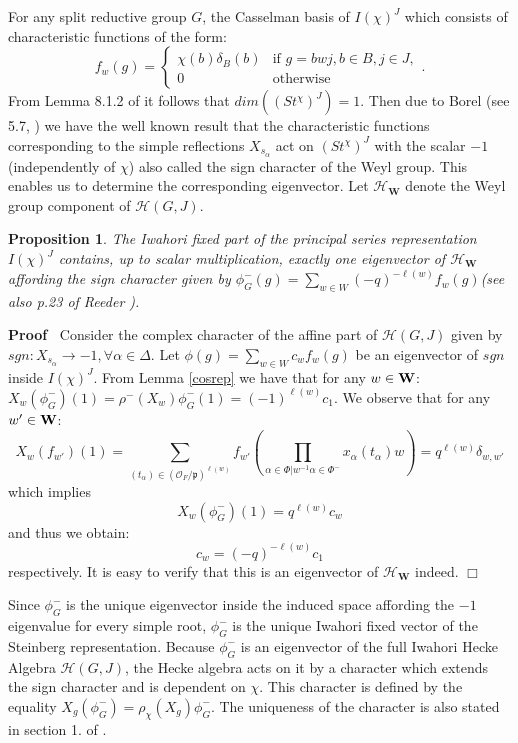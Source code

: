 \documentclass{article}
\newenvironment{proof}{\noindent\textbf{Proof\ }}{\hspace*{\fill}$\Box$\medskip}
\newtheorem{proposition}{Proposition}
\begin{document}
For any split reductive group $G$, the Casselman basis of $I(\chi)^J$ which consists of characteristic functions of the form:
$$f_w(g)=\begin{cases}
        \chi(b)\delta_B(b) & \text{if } g=bwj, b\in B,j\in J,   \\
        0 & \text{otherwise} 
    \end{cases}.
$$
 From Lemma 8.1.2 of \cite{cassnotes} it follows that $dim((St^{\chi})^J)=1$. Then due to Borel (see 5.7, \cite{bor}) we have the well known result that the characteristic functions corresponding to the simple reflections $X_{s_{\alpha}}$ act on $(St^{\chi})^J$ with the scalar $-1$ (independently of $\chi$) also called the sign character of the Weyl group. This enables us to determine the corresponding eigenvector. Let $\mathcal{H}_{\mathbf{W}}$ denote the Weyl group component of $\mathcal{H}(G,J)$.
\begin{proposition} \label{fixvec}
    The Iwahori fixed part of the principal series representation $I(\chi)^J$ contains, up to scalar multiplication, exactly one eigenvector of $\mathcal{H}_{\mathbf{W}}$ affording the sign character given by $\phi_G^-(g)=\sum\limits_{w\in W}(-q)^{-\ell(w)}f_w(g)$(see also p.23 of Reeder \cite{reeder}).
\end{proposition}
\begin{proof}
    Consider the complex character of the affine part of $\mathcal{H}(G,J)$ given by $sgn:X_{s_{\alpha}}\to -1, \forall\alpha\in\Delta$. Let $\phi(g)=\sum\limits_{w\in W}c_wf_w(g)$ be an eigenvector of $sgn$ inside $I(\chi)^J$. From Lemma \ref{cosrep} we have that for any $w\in\bf{W}$: $X_w(\phi_G^-)(1)=\rho^-(X_w)\phi_G^-(1)=(-1)^{\ell(w)}c_1$. We observe that for any $w'\in \bf{W}$: $$X_w(f_{w'})(1)=\sum\limits_{(t_{\alpha})\in(\mathcal{O}_F/\mathfrak{p})^{\ell(w)}}f_{w'}(\prod\limits_{\alpha\in\Phi|w^{-1}\alpha\in\Phi^-}x_{\alpha}(t_{\alpha})w)=q^{\ell(w)}\delta_{w,w'}$$ which implies $$X_w(\phi_G^-)(1)=q^{\ell(w)}c_w$$ and thus we obtain: $$c_w=(-q)^{-\ell(w)}c_1$$ respectively.
    It is easy to verify that this is an eigenvector of $\mathcal{H}_{\mathbf{W}}$ indeed.
\end{proof} \par 
Since $\phi_G^-$ is the unique eigenvector inside the induced space affording the $-1$ eigenvalue for every simple root, $\phi_G^-$ is the unique Iwahori fixed vector of the Steinberg representation. Because $\phi_G^-$ is an eigenvector of the full Iwahori Hecke Algebra $\mathcal{H}(G,J)$, the Hecke algebra acts on it by a character which extends the sign character and is dependent on $\chi$. This character is defined by the equality $X_g(\phi_G^-)=\rho_\chi(X_g)\phi_G^-$. The uniqueness of the character is also stated in section 1. of \cite{shal}.
\end{document}
